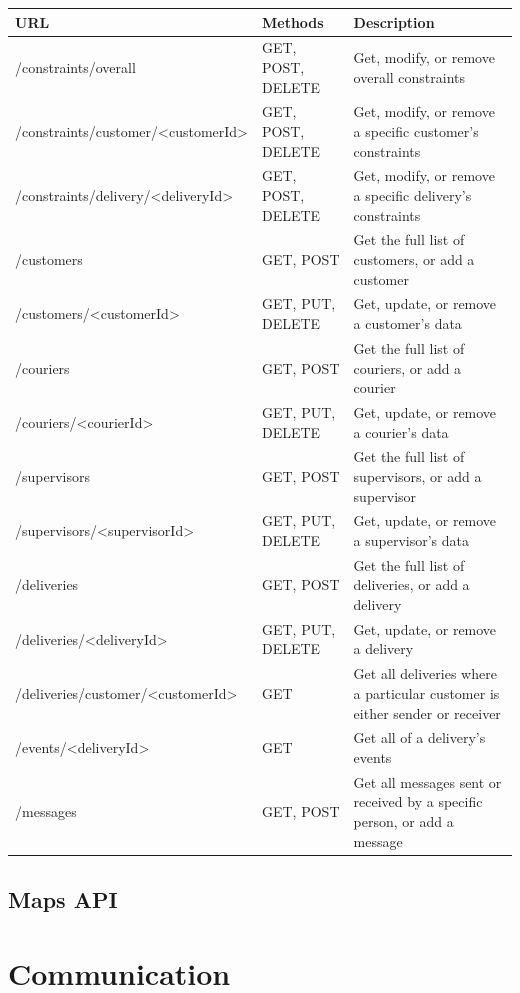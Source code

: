 \begin{center}
\begin{tabular}{ | m{6.1cm} | m{3.8cm}| m{6cm} | } 
\hline
URL & Methods & Description \\
\hline
/constraints/overall & GET, POST, DELETE & Get, modify, or remove overall constraints \\
\hline
/constraints/customer/<customerId> & GET, POST, DELETE & Get, modify, or remove a specific customer's constraints \\
\hline
/constraints/delivery/<deliveryId> & GET, POST, DELETE & Get, modify, or remove a specific delivery's constraints\\
\hline
/customers & GET, POST & Get the full list of customers, or add a customer\\
\hline
/customers/<customerId> & GET, PUT, DELETE & Get, update, or remove a customer's data\\
\hline
/couriers & GET, POST & Get the full list of couriers, or add a courier\\
\hline
/couriers/<courierId> & GET, PUT, DELETE & Get, update, or remove a courier's data\\
\hline
/supervisors & GET, POST & Get the full list of supervisors, or add a supervisor\\
\hline
/supervisors/<supervisorId> & GET, PUT, DELETE & Get, update, or remove a supervisor's data\\
\hline
/deliveries & GET, POST & Get the full list of deliveries, or add a delivery\\
\hline
/deliveries/<deliveryId> & GET, PUT, DELETE & Get, update, or remove a delivery\\
\hline
/deliveries/customer/<customerId> & GET & Get all deliveries where a particular customer is either sender or receiver\\
\hline
/events/<deliveryId> & GET & Get all of a delivery's events\\
\hline
/messages & GET, POST & Get all messages sent or received by a specific person, or add a message\\
\hline
\end{tabular}
\end{center}
\subsection{Maps API}
\section{Communication}

